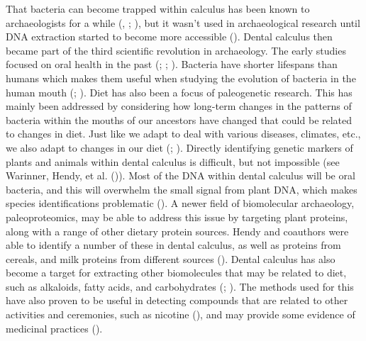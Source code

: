 \documentclass[
  b5paper,
]{book}
\begin{document}
That bacteria can become trapped within calculus has been known to
archaeologists for a while
(, ;
), but it wasn't used in archaeological research until DNA
extraction started to become more accessible
().
Dental calculus then became part of the third scientific revolution in
archaeology. The early studies focused on oral health in the past
(;
;
). Bacteria have shorter lifespans than humans which makes them
useful when studying the evolution of bacteria in the human mouth
(;
).
Diet has also been a focus of paleogenetic research. This has mainly
been addressed by considering how long-term changes in the patterns of
bacteria within the mouths of our ancestors have changed that could be
related to changes in diet. Just like we adapt to deal with various
diseases, climates, etc., we also adapt to changes in our diet
(;
).
Directly identifying genetic markers of plants and animals within dental
calculus is difficult, but not impossible (see Warinner, Hendy, et al.
()). Most of the DNA within
dental calculus will be oral bacteria, and this will overwhelm the small
signal from plant DNA, which makes species identifications problematic
(). A newer field of biomolecular archaeology, paleoproteomics, may
be able to address this issue by targeting plant proteins, along with a
range of other dietary protein sources. Hendy and coauthors were able to
identify a number of these in dental calculus, as well as proteins from
cereals, and milk proteins from different sources
(). Dental
calculus has also become a target for extracting other biomolecules that
may be related to diet, such as alkaloids, fatty acids, and
carbohydrates
(; ).
The methods used for this have also proven to be useful in detecting
compounds that are related to other activities and ceremonies, such as
nicotine (), and may provide some evidence of medicinal practices
().
\end{document}

